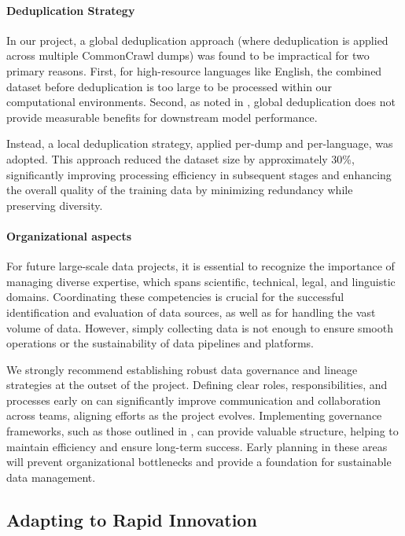 \paragraph{Deduplication Strategy}

In our project, a global deduplication approach (where deduplication is 
applied across multiple CommonCrawl dumps) was found to be impractical 
for two primary reasons. First, for high-resource languages like English, 
the combined dataset before deduplication is too large to be processed 
within our computational environments. Second, as noted in 
\cite{penedo_kydlicek_etal2024}, global deduplication does not provide 
measurable benefits for downstream model performance.

Instead, a local deduplication strategy, applied per-dump and per-language, 
was adopted. This approach reduced the dataset size by approximately 30\%, 
significantly improving processing efficiency in subsequent stages and 
enhancing the overall quality of the training data by minimizing redundancy 
while preserving diversity.


\paragraph{Organizational aspects}
For future large-scale data projects, it is essential to recognize the 
importance of managing diverse expertise, which spans scientific, technical, 
legal, and linguistic domains. Coordinating these competencies is crucial 
for the successful identification and evaluation of data sources, as well 
as for handling the vast volume of data. However, simply collecting data 
is not enough to ensure smooth operations or the sustainability of data 
pipelines and platforms.

We strongly recommend establishing robust data governance and lineage 
strategies at the outset of the project. Defining clear roles, responsibilities, 
and processes early on can significantly improve communication and collaboration 
across teams, aligning efforts as the project evolves. Implementing governance 
frameworks, such as those outlined in \cite{jernite_nguyen_etal2022}, can 
provide valuable structure, helping to maintain efficiency and ensure 
long-term success. Early planning in these areas will prevent organizational 
bottlenecks and provide a foundation for sustainable data management.


\subsection{Adapting to Rapid Innovation}
\label{sec:insights.innovation}

